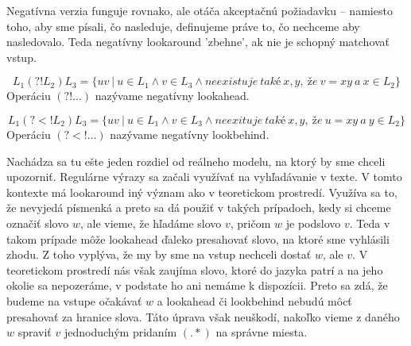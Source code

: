 Negatívna verzia funguje rovnako, ale otáča akceptačnú požiadavku -- namiesto toho, aby sme písali, čo nasleduje, definujeme práve to, čo nechceme aby nasledovalo. Teda negatívny lookaround 'zbehne', ak nie je schopný matchovať vstup.

\begin{df}
$$ L_{1}(?!L_{2})L_{3} = \lbrace uv ~|~ u \in L_{1} \land v \in L_{3} \land neexistuje~také~x,y,~že~v=xy~a~x \in L_2 \rbrace $$ Operáciu $(?!\dots)$ nazývame negatívny lookahead.
\end{df}

\begin{df}
$$ L_{1}(?<!L_{2})L_{3} = \lbrace uv ~|~ u \in L_{1} \land v \in L_{3} \land neexituje~také~x,y,~že~u=xy~a~y \in L_2 \rbrace $$ Operáciu $(?<!\dots)$ nazývame negatívny lookbehind.
\end{df}

Nachádza sa tu ešte jeden rozdiel od reálneho modelu, na ktorý by sme chceli upozorniť. Regulárne výrazy sa začali využívať na vyhľadávanie v texte. V tomto kontexte má lookaround iný význam ako v teoretickom prostredí. Využíva sa to, že nevyjedá písmenká a preto sa dá použiť v takých prípadoch, kedy si chceme označiť slovo $w$, ale vieme, že hľadáme slovo $v$, pričom $w$ je podslovo $v$. Teda v takom prípade môže lookahead ďaleko presahovať slovo, na ktoré sme vyhlásili zhodu. Z toho vyplýva, že my by sme na vstup nechceli dostať $w$, ale $v$. V teoretickom prostredí nás však zaujíma slovo, ktoré do jazyka patrí a na jeho okolie sa nepozeráme, v podstate ho ani nemáme k dispozícii. Preto sa zdá, že budeme na vstupe očakávať $w$ a lookahead či lookbehind nebudú môcť presahovať za hranice slova. Táto úprava však neuškodí, nakoľko vieme z daného $w$ spraviť $v$ jednoduchým pridaním $(.*)$ na správne miesta.
